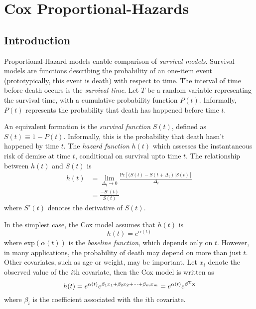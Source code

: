 
\chapter[Cox Proportional-Hazards]{Cox Proportional-Hazards}

\section{Introduction}
Proportional-Hazard models enable comparison of \textit{survival models}. Survival models are functions describing the probability of an one-item event (prototypically, this event is death) with respect to time.  The interval of time before death occurs is the \textit{survival time}.   Let $T$ be a random variable representing the survival time, with a cumulative probability function $P(t)$.  Informally, $P(t)$ represents the probability that death has happened before time $t$.  

An equivalent formation is the \textit{survival function} $S(t)$, defined as $S(t) \equiv 1 - P(t)$.  Informally, this is the probability that death hasn't happened by time $t$.  The \textit{hazard function} $h(t)$ which assesses the instantaneous risk of demise at time $t$, conditional on survival upto time $t$.  The relationship between $h(t)$ and $S(t)$ is 
\begin{align}
h(t) &= \lim_{\Delta_t \rightarrow 0}  \frac{\mbox{Pr}[(S(t) - S(t + \Delta_t) | S(t) ]}{\Delta_t}\\
& = \frac{-S'(t)}{S(t)}
\end{align}
where $S'(t)$ denotes the derivative of $S(t)$.

In the simplest case, the Cox model assumes that $h(t)$ is
\begin{equation}
h(t) = e^{\alpha(t)}
\end{equation}
where exp$(\alpha(t))$ is the \textit{baseline function}, which depends only on $t$.  However, in many applications, the probability of death may depend on more than just $t$.  Other covariates, such as age or weight, may be important.  Let $x_i$ denote the observed value of the  $i$th covariate, then the Cox model is written as 
\begin{equation}
h(t) = e^{\alpha(t)} e^{\beta_1 x_1 + \beta_2 x_2 + \dots + \beta_m x_m} = e^{\alpha(t)} e^{\bold{\beta^T x}}
\end{equation}
where $\beta_i$ is the coefficient associated with the $i$th covariate.  

